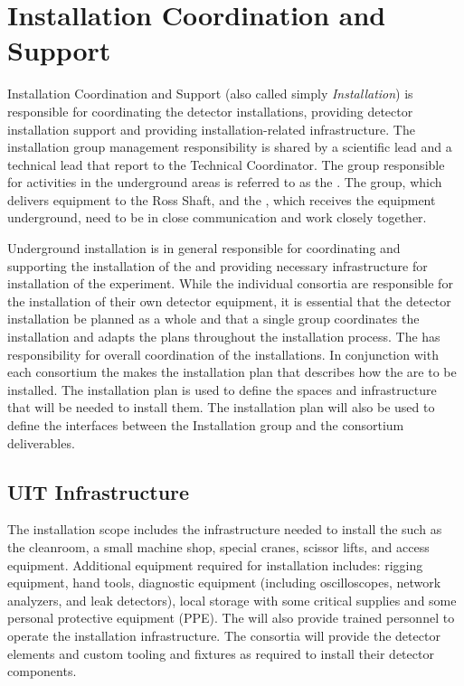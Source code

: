 \section{Installation Coordination and Support}
\label{sec:fdsp-coord-install}


Installation Coordination and Support %
(also called simply \textit{Installation}) is
responsible for coordinating the detector installations, providing
detector installation support and providing installation-related
infrastructure. The installation group management responsibility is
shared by a scientific lead and a technical lead that report to the
Technical Coordinator. The %
group responsible for activities in the underground areas is referred to as
the . The  group, which delivers equipment to the
Ross Shaft, and the , which receives the equipment
underground, need to be in close communication and work closely
together.

Underground installation is in general responsible for coordinating
and supporting the installation of the  and providing
necessary infrastructure for installation of the experiment. While the
individual consortia are responsible for the installation of their own
detector equipment, it is essential that the detector installation be
planned as a whole and that a single group coordinates the
installation and adapts the plans throughout the installation
process. The  has responsibility for overall coordination
of the installations. In conjunction with each consortium the
 makes the installation plan that describes how the
 are to be installed. The installation plan is used to define
the spaces and infrastructure that will be needed to install them.
The installation plan will also be used to define the
interfaces between the Installation group and the consortium
deliverables.

\subsection{UIT Infrastructure}

The installation scope includes the infrastructure needed to install
the  such as the cleanroom, a small machine shop, special
cranes, scissor lifts, and access equipment.  Additional equipment
required for installation includes: rigging equipment, hand tools,
diagnostic equipment (including oscilloscopes, network analyzers, and
leak detectors), local storage with some critical supplies and some
personal protective equipment (PPE). The  will also provide
trained personnel to operate the installation infrastructure. The
consortia will provide the detector elements and custom tooling and
fixtures as required to install their detector components.




